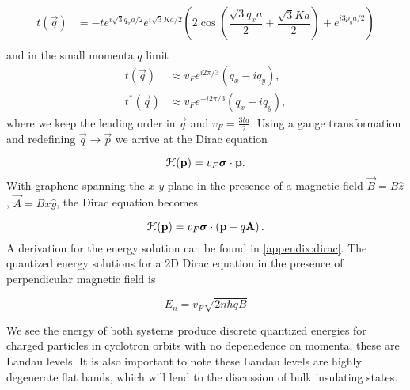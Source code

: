 \begin{align}
  t(\vec{q}) &= -t e^{i\sqrt{3} q_x a / 2} e^{i\sqrt{3} K a / 2} \left( 2\cos{\left( \dfrac{\sqrt{3} q_x a }{2}  + \dfrac{\sqrt{3} K a}{2} \right)} + e^{i 3 p_y a /2 } \right) \nonumber \\
\end{align}
and in the small momenta $q$ limit
\begin{align}
  t(\vec{q}) &\approx v_F e^{i 2\pi/3} \left(q_x - iq_y \right), \nonumber \\
  t^*(\vec{q}) &\approx v_F e^{-i 2\pi/3} \left(q_x + iq_y \right), \nonumber
\end{align}
where we keep the leading order in $\vec{q}$ and $v_F = \tfrac{3ta}{2}$.
Using a gauge transformation and redefining $\vec{q} \rightarrow \vec{p}$ we arrive at the Dirac equation

\begin{equation}
  \mathcal{H}(\mathbf{p}) = v_F \bm{\sigma}\cdot \mathbf{p}.
\end{equation}
With graphene spanning the $x$-$y$ plane in the presence of a magnetic field $\vec{B} = B\hat{z}$, $\vec{A} =  Bx\hat{y}$, the Dirac equation becomes

\begin{equation}
  \mathcal{H}(\mathbf{p}) = v_F \bm{\sigma}\cdot \left(\mathbf{p} - q\mathbf{A} \right).
\end{equation}
A derivation for the energy solution can be found in \ref{appendix:dirac}.
The quantized energy solutions for a 2D Dirac equation in the presence of perpendicular magnetic field is

\begin{equation}
  E_n = v_F \sqrt{2 n \hbar qB }
\end{equation}

We see the energy of both systems produce discrete quantized energies for charged particles in cyclotron orbits with no depenedence on momenta, these are Landau levels.
It is also important to note these Landau levels are highly degenerate flat bands, which will lend to the discussion of bulk insulating states.

